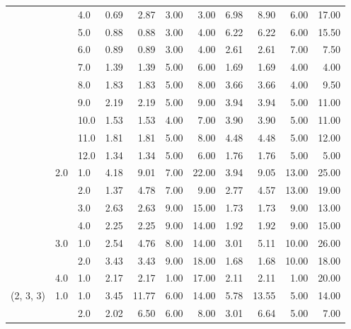 \begin{tabular}{lllrrrrrrrr}
          &     & 4.0  &       0.69 &      2.87 &  3.00 &   3.00 &       6.98 &      8.90 &  6.00 &  17.00 \\
          &     & 5.0  &       0.88 &      0.88 &  3.00 &   4.00 &       6.22 &      6.22 &  6.00 &  15.50 \\
          &     & 6.0  &       0.89 &      0.89 &  3.00 &   4.00 &       2.61 &      2.61 &  7.00 &   7.50 \\
          &     & 7.0  &       1.39 &      1.39 &  5.00 &   6.00 &       1.69 &      1.69 &  4.00 &   4.00 \\
          &     & 8.0  &       1.83 &      1.83 &  5.00 &   8.00 &       3.66 &      3.66 &  4.00 &   9.50 \\
          &     & 9.0  &       2.19 &      2.19 &  5.00 &   9.00 &       3.94 &      3.94 &  5.00 &  11.00 \\
          &     & 10.0 &       1.53 &      1.53 &  4.00 &   7.00 &       3.90 &      3.90 &  5.00 &  11.00 \\
          &     & 11.0 &       1.81 &      1.81 &  5.00 &   8.00 &       4.48 &      4.48 &  5.00 &  12.00 \\
          &     & 12.0 &       1.34 &      1.34 &  5.00 &   6.00 &       1.76 &      1.76 &  5.00 &   5.00 \\
          & 2.0 & 1.0  &       4.18 &      9.01 &  7.00 &  22.00 &       3.94 &      9.05 & 13.00 &  25.00 \\
          &     & 2.0  &       1.37 &      4.78 &  7.00 &   9.00 &       2.77 &      4.57 & 13.00 &  19.00 \\
          &     & 3.0  &       2.63 &      2.63 &  9.00 &  15.00 &       1.73 &      1.73 &  9.00 &  13.00 \\
          &     & 4.0  &       2.25 &      2.25 &  9.00 &  14.00 &       1.92 &      1.92 &  9.00 &  15.00 \\
          & 3.0 & 1.0  &       2.54 &      4.76 &  8.00 &  14.00 &       3.01 &      5.11 & 10.00 &  26.00 \\
          &     & 2.0  &       3.43 &      3.43 &  9.00 &  18.00 &       1.68 &      1.68 & 10.00 &  18.00 \\
          & 4.0 & 1.0  &       2.17 &      2.17 &  1.00 &  17.00 &       2.11 &      2.11 &  1.00 &  20.00 \\
(2, 3, 3) & 1.0 & 1.0  &       3.45 &     11.77 &  6.00 &  14.00 &       5.78 &     13.55 &  5.00 &  14.00 \\
          &     & 2.0  &       2.02 &      6.50 &  6.00 &   8.00 &       3.01 &      6.64 &  5.00 &   7.00 \\

\end{tabular}
